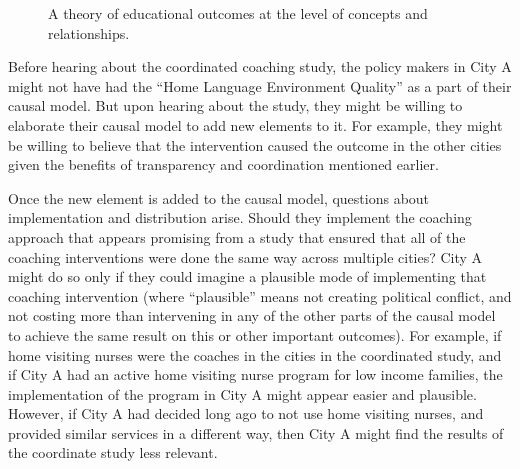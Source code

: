 \documentclass[
  11pt,
]{article}
\begin{document}
\begin{figure}[H]
\centering
{}
\caption{A theory of educational outcomes at the level of concepts and
relationships.}\label{fig:theory2}
\end{figure}

Before hearing about the coordinated coaching study, the policy makers
in City A might not have had the ``Home Language Environment Quality''
as a part of their causal model. But upon hearing about the study, they
might be willing to elaborate their causal model to add new elements to
it. For example, they might be willing to believe that the intervention
caused the outcome in the other cities given the benefits of
transparency and coordination mentioned earlier.

Once the new element is added to the causal model, questions about
implementation and distribution arise. Should they implement the
coaching approach that appears promising from a study that ensured that
all of the coaching interventions were done the same way across multiple
cities? City A might do so only if they could imagine a plausible mode
of implementing that coaching intervention (where ``plausible'' means
not creating political conflict, and not costing more than intervening
in any of the other parts of the causal model to achieve the same result
on this or other important outcomes). For example, if home visiting
nurses were the coaches in the cities in the coordinated study, and if
City A had an active home visiting nurse program for low income
families, the implementation of the program in City A might appear
easier and plausible. However, if City A had decided long ago to not use
home visiting nurses, and provided similar services in a different way,
then City A might find the results of the coordinate study less
relevant.
\end{document}
